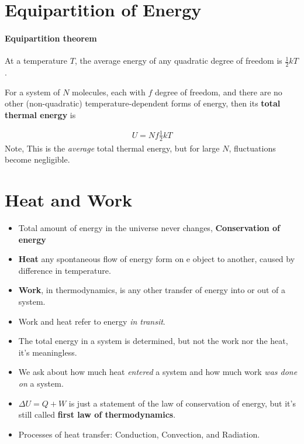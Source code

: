 \documentclass{book}
\begin{document}
\section{Equipartition of Energy}%
\label{sec:equi of energy}

\paragraph{Equipartition theorem} At a temperature $T$, the average energy of any
quadratic degree of freedom is $\frac{1}{2}kT$.

For a system of $N$ molecules, each with $f$ degree of freedom, and there are no other
(non-quadratic) temperature-dependent forms of energy, then its \textbf{total thermal energy} is

\begin{align}
	U = Nf \frac{1}{2}kT
\end{align}
Note, This is the \textit{average} total thermal energy,
but for large $N$, fluctuations become negligible.


\section{Heat and Work}%
\label{sec:heat and work}

\begin{itemize}
	\item Total amount of energy in the universe never changes, \textbf{Conservation of energy}
	\item \textbf{Heat} any spontaneous flow of energy form on e object to another, caused by
	      difference in temperature.
	\item \textbf{Work}, in thermodynamics, is any other transfer of energy into or out of a system.
	\item Work and heat refer to energy \textit{in transit}.
	\item The total energy in a system is determined, but not the work nor the heat, it's meaningless.
	\item We ask about how much heat \textit{entered} a system and how much work
	      \textit{was done on} a system.
	\item $\Delta{U} = Q + W$
	      is just a statement of the law of conservation of energy, but it's still called
	      \textbf{first law of thermodynamics}.
	\item Processes of heat transfer: Conduction, Convection, and Radiation.
\end{itemize}
\end{document}
